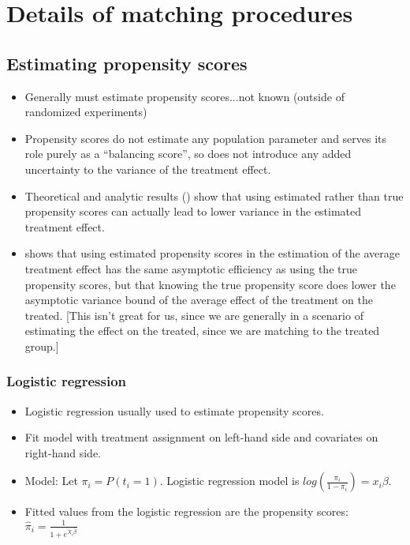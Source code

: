 \documentclass[11pt,titlepage]{article}
\begin{document}
                                                                                                                                                             
\section{Details of matching procedures}
\subsection{Estimating propensity scores}
\label{pscorest}
\begin{itemize}
\item Generally must estimate propensity scores...not known (outside of randomized experiments)
\item Propensity scores do not estimate any population
parameter and serves its role purely as a ``balancing score'', so does
not introduce any added uncertainty to the variance of the treatment
effect. 
\item Theoretical and analytic results (\cite{RubTho92b, RubTho96, HilRubTho99}) show that using estimated rather than true propensity scores
can actually lead to lower variance in the estimated treatment effect.  
\item \cite{Hahn98} shows that using estimated propensity scores in the estimation
of the average treatment effect has the same asymptotic efficiency as using the true propensity scores, but that knowing the true propensity score
does lower the asymptotic variance bound of the average effect of the treatment on the treated.  [This isn't great for us, since we are generally in a scenario
of estimating the effect on the treated, since we are matching to the treated group.] 
\end{itemize}

\subsubsection{Logistic regression}
\begin{itemize}
\item Logistic regression usually used to estimate propensity scores.  
\item Fit model with treatment assignment on left-hand side and covariates on right-hand side.
\item Model:  Let $\pi_i=P(t_i=1)$.  Logistic regression model is $log(\frac{\pi_i}{1-\pi_i}) = x_i \beta$. 
\item Fitted values from the logistic regression are the propensity scores: $\hat{\pi}_i = \frac{1}{1+e^{X_i \hat{\beta}}}$
\end{itemize}
\end{document}
